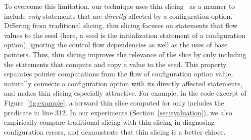 
To overcome this limitation, our technique uses thin
slicing~\cite{Sridharan:2007} as a manner to include
\textit{only} statements that are \textit{directly} affected by a configuration option.
Differing from traditional slicing, thin slicing
focuses on statements that flow values to the seed (here, a
seed is the initialization statement of a configuration option), ignoring the 
control flow dependencies as well as the uses of
base pointers. Thus, thin slicing improves the relevance
of the slice by only including the statements that compute
and copy a value to the seed.
This property separates
pointer computations from the flow of configuration option value,
naturally connects a configuration option with its
directly affected statements, and makes thin slicing
especially attractive.
For example, in the code excerpt of Figure~\ref{fig:example},
a forward thin slice computed for 
only includes the predicate in line 312.
In our experiments (Section~\ref{sec:evaluation}), 
we also empirically compare traditional slicing with
thin slicing in diagnosing configuration errors, and demonstrate
that thin slicing is a better chioce.




% 
